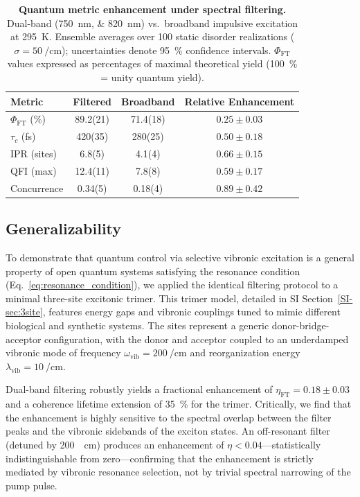 \documentclass[journal=jpcl,manuscript=letter]{achemso}
\begin{document}
\begin{table}[t]
\centering
\caption{\textbf{Quantum metric enhancement under spectral filtering.} Dual-band (\SIlist{750;820}{\nano\meter}) vs.\ broadband impulsive excitation at \SI{295}{\kelvin}. Ensemble averages over \num{100} static disorder realizations ($\sigma = \SI{50}{\per\centi\meter}$); uncertainties denote \SI{95}{\percent} confidence intervals. $\Phi_{\mathrm{FT}}$ values expressed as percentages of maximal theoretical yield (\SI{100}{\percent} = unity quantum yield).}
\label{tab:quantum_metrics}
\begin{tabular}{lccc}
\toprule
\textbf{Metric} & \textbf{Filtered} & \textbf{Broadband} & \textbf{Relative Enhancement} \\
\midrule
$\Phi_{\mathrm{FT}}$ (\si{\percent}) & 89.2(21) & 71.4(18) & $0.25 \pm 0.03$ \\
$\tau_c$ (\si{\femto\second}) & 420(35) & 280(25) & $0.50 \pm 0.18$ \\
IPR (sites) & 6.8(5) & 4.1(4) & $0.66 \pm 0.15$ \\
QFI (max) & 12.4(11) & 7.8(8) & $0.59 \pm 0.17$ \\
Concurrence & 0.34(5) & 0.18(4) & $0.89 \pm 0.42$ \\
\bottomrule
\end{tabular}
\end{table}

\subsection*{Generalizability}

To demonstrate that quantum control via selective vibronic excitation is a general property of open quantum systems satisfying the resonance condition (Eq.~\cref{eq:resonance_condition}), we applied the identical filtering protocol to a minimal three-site excitonic trimer. This trimer model, detailed in SI Section~\ref{SI-sec:3site}, features energy gaps and vibronic couplings tuned to mimic different biological and synthetic systems. The sites represent a generic donor-bridge-acceptor configuration, with the donor and acceptor coupled to an underdamped vibronic mode of frequency $\omega_{\mathrm{vib}} = \SI{200}{\per\centi\meter}$ and reorganization energy $\lambda_{\mathrm{vib}} = \SI{10}{\per\centi\meter}$.

Dual-band filtering robustly yields a fractional enhancement of $\eta_{\mathrm{FT}} = 0.18 \pm 0.03$ and a coherence lifetime extension of \SI{35}{\percent} for the trimer. Critically, we find that the enhancement is highly sensitive to the spectral overlap between the filter peaks and the vibronic sidebands of the exciton states. An off-resonant filter (detuned by \SI{200}{\per\centi\meter}) produces an enhancement of $\eta < 0.04$---statistically indistinguishable from zero---confirming that the enhancement is strictly mediated by vibronic resonance selection, not by trivial spectral narrowing of the pump pulse. 
\end{document}
